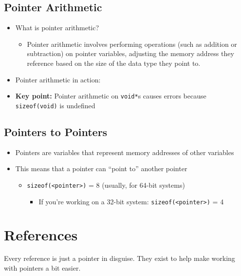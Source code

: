 \documentclass{article}
\begin{document}


\subsection{Pointer Arithmetic}

\begin{itemize}
	\item What is pointer arithmetic?
	\begin{itemize}
		\item Pointer arithmetic involves performing operations (such as addition or subtraction) on pointer variables, adjusting the memory address they reference based on the size of the data type they point to.
	\end{itemize}
	\item Pointer arithmetic in action:
	
	\item \textbf{Key point:} Pointer arithmetic on \texttt{void*}s causes errors because \texttt{sizeof(void)} is undefined
\end{itemize}

\subsection{Pointers to Pointers}

\begin{itemize}
	\item Pointers are variables that represent memory addresses of other variables
	\item This means that a pointer can ``point to'' another pointer
	\begin{itemize}
		\item \texttt{sizeof(<pointer>)} = 8 (usually, for 64-bit systems)
		\begin{itemize}
			\item If you're working on a 32-bit system: \texttt{sizeof(<pointer>)} = 4
		\end{itemize}
	\end{itemize}
	
\end{itemize}

\section{References}

\noindent
Every reference is just a pointer in disguise. They exist to help make working with pointers a bit easier.
\end{document}
